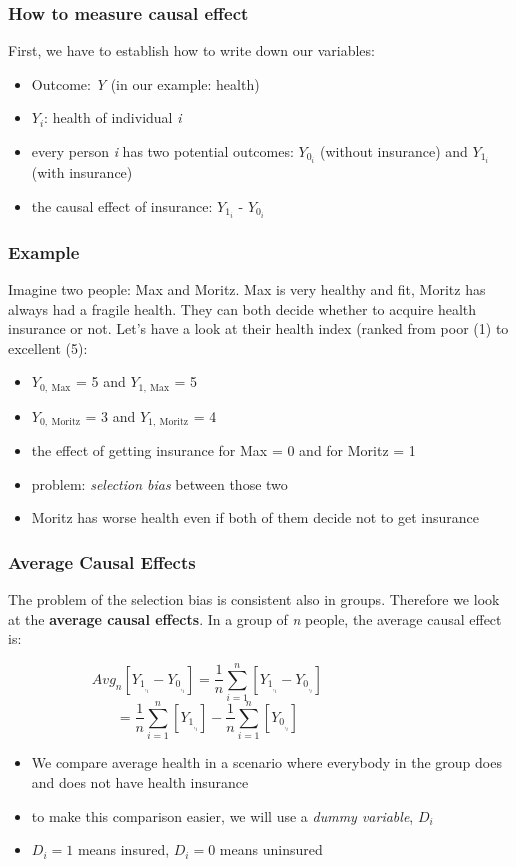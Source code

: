 \documentclass{beamer}
\begin{document}
\begin{frame}
\frametitle{How to measure causal effect}
First, we have to establish how to write down our variables:
\begin{itemize}
\item Outcome: \textit{Y} (in our example: health)
\item {$Y_i$}: health of individual \textit{i}
\item every person \textit{i} has two potential outcomes: $Y_0_i$ (without insurance) and $Y_1_i$ (with insurance)
\item the causal effect of insurance: $Y_1_i$ - $Y_0_i$
\end{itemize}
\end{frame}
\begin{frame}
\frametitle{Example}
Imagine two people: Max and Moritz. Max is very healthy and fit, Moritz has always had a fragile health.
They can both decide whether to acquire health insurance or not. Let's have a look at their health index (ranked from poor (1) to excellent (5):
\begin{itemize}
\item $Y_{0,~\mathrm{Max}}$ = 5 and $Y_{1,~\mathrm{Max}}$ = 5
\item $Y_{0,~\mathrm{Moritz}}$ = 3 and $Y_{1,~\mathrm{Moritz}}$ = 4 
\item the effect of getting insurance for Max = 0 and for Moritz = 1
\item problem: \textit{selection bias} between those two
\item Moritz has worse health even if both of them decide not to get insurance
\end{itemize}

\end{frame}
\begin{frame}
\frametitle{Average Causal Effects}
The problem of the selection bias is consistent also in groups. Therefore we look at the \textbf{average causal effects}. In a group of \textit{n} people, the average causal effect is:

$$Avg_n[Y_1_,_i - Y_0_,_i] = \frac{1}{n} \sum_{i=1}^n [Y_1_,_i - Y_0_,_i]~~~~~~~~~~~~~~~~~~~~~~~~~~~~~~~~~~$$
$$=\frac{1}{n}\sum_{i=1}^{n}{[Y_1_,_i]} - \frac{1}{n} \sum_{i=1}^n [Y_0_,_i]~~~~~~~~~~~~~~~~~~~~~~~~~~~~~~~~~~$$
\begin{itemize}
	\item We compare average health in a scenario where everybody in the group does and does not have health insurance
	\item to make this comparison easier, we will use a \textit{dummy variable}, $D_i$
	\item $D_i=1$ means insured, $D_i=0$ means uninsured
\end{itemize}
\end{frame}
\end{document}
